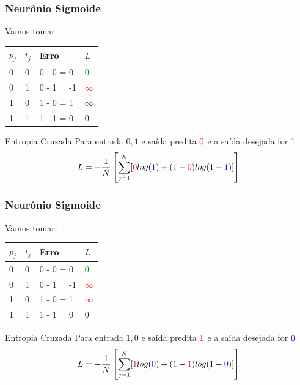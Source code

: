 \documentclass{beamer}
\begin{document}
\begin{frame}
	\frametitle{Neurônio Sigmoide}
	Vamos tomar:
	\begin{table}[]
		\begin{tabular}{|l|l|l|l|}
			\hline
			$p_j$ & $t_j$ & Erro  & $L$ \\ \hline
			0  & 0  & 0 - 0 = 0  & \textcolor{green}{0}  \\ \hline
			0  & 1  & 0 - 1 = -1 & \textcolor{red}{$\infty$} \\ \hline
			1  & 0  & 1 - 0 = 1  & $\infty$ \\ \hline
			1  & 1  & 1 - 1 = 0  & 0 \\ \hline
		\end{tabular}
	\end{table}
	\begin{block}{Entropia Cruzada}
		Para entrada $0, 1$ e saída predita $\textcolor{red}{0}$ e a saída desejada for $\textcolor{blue}{1}$
		\begin{gather*}
			L = - \frac{1}{N} \left [ \sum_{j=1}^{N} [\textcolor{red}{0} log(\textcolor{blue}{1} ) + (1-\textcolor{red}{0})log(1-\textcolor{blue}{1} )] \right ] 
		\end{gather*}
	\end{block}
\end{frame}
\begin{frame}
	\frametitle{Neurônio Sigmoide}
	Vamos tomar:
	\begin{table}[]
	\begin{tabular}{|l|l|l|l|}
		\hline
		$p_j$ & $t_j$ & Erro  & $L$ \\ \hline
		0  & 0  & 0 - 0 = 0  & \textcolor{green}{0}  \\ \hline
		0  & 1  & 0 - 1 = -1 & \textcolor{red}{$\infty$} \\ \hline
		1  & 0  & 1 - 0 = 1  & \textcolor{red}{$\infty$} \\ \hline
		1  & 1  & 1 - 1 = 0  & 0 \\ \hline
	\end{tabular}
\end{table}
\begin{block}{Entropia Cruzada}
	Para entrada $1, 0$ e saída predita $\textcolor{red}{1}$ e a saída desejada for $\textcolor{blue}{0}$
	\begin{gather*}
		L = - \frac{1}{N} \left [ \sum_{j=1}^{N} [\textcolor{red}{1} log(\textcolor{blue}{0} ) + (1-\textcolor{red}{1})log(1-\textcolor{blue}{0} )] \right ] 
	\end{gather*}
\end{block}
\end{frame}
\end{document}
